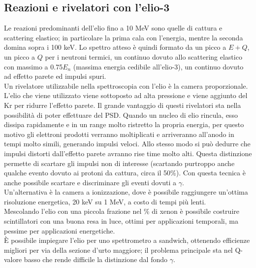 \subsection{Reazioni e rivelatori con l'elio-3}
Le reazioni predominanti dell'elio fino a 10 MeV sono quelle di cattura e scattering elastico; in particolare la prima cala con l'energia, mentre
la seconda domina sopra i 100 keV.
Lo spettro atteso \`e quindi formato da un picco a $E+Q$, un picco a $Q$ per i neutroni termici, un continuo dovuto allo scattering elastico
con massimo a 0.75$E_n$ (massima energia cedibile all'elio-3), un continuo dovuto ad effetto parete ed impulsi spuri.\\
Un rivelatore utilizzabile nella spettroscopia con l'elio \`e la camera proporzionale.
L'elio che viene utilizzato viene sottoposto ad alta pressione e viene aggiunto del Kr per ridurre l'effetto parete.
Il grande vantaggio di questi rivelatori sta nella possibilit\`a di poter effettuare del PSD.
Quando un nucleo di elio rincula, esso dissipa rapidamente e in un range molto ristretto la propria energia, per questo motivo
gli elettroni prodotti verranno moltiplicati e arriveranno all'anodo in tempi molto simili, generando impulsi veloci.
Allo stesso modo si pu\`o dedurre che impulsi distorti dall'effetto parete avranno rise time molto alti.
Questa distinzione permette di scartare gli impulsi non di interesse (scartando purtroppo anche qualche evento dovuto ai protoni da cattura, circa il 50\%).
Con questa tecnica \`e anche possibile scartare e discriminare gli eventi dovuti a $\gamma$.\\
Un'alternativa \`e la camera a ionizzazione, dove \`e possibile raggiungere un'ottima risoluzione energetica, 20 keV su 1 MeV, a costo di tempi pi\`u lenti.\\
Mescolando l'elio con una piccola frazione nel \% di xenon \`e possibile costruire scintillatori con una buona resa in luce, ottimi per applicazioni
temporali, ma pessime per applicazioni energetiche.\\
\`E possibile impiegare l'elio per uno spettrometro a sandwich, ottenendo efficienze migliori per via della sezione d'urto maggiore;
il problema principale sta nel Q-valore basso che rende difficile la distinzione dal fondo $\gamma$.
